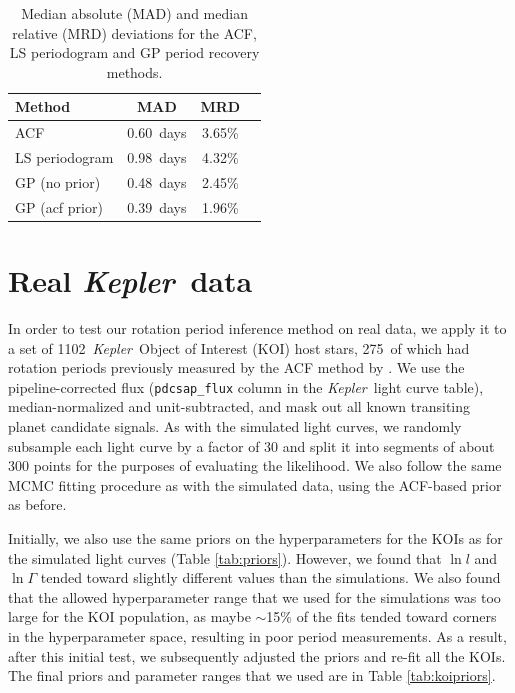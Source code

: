 \documentclass[useAMS, usenatbib, preprint, 12pt]{aastex}
\newcommand{\Kepler}{{\it Kepler}}
\newcommand{\kepler}{\Kepler}
\newcommand{\nkois}{1102}
\newcommand{\nkoimcq}{275}
\newcommand{\acfMAD}{0.60}
\newcommand{\percentacfMAD}{3.65}
\newcommand{\pgramMAD}{0.98}
\newcommand{\percentpgramMAD}{4.32}
\newcommand{\gpMADnp}{0.48}
\newcommand{\percentgpMADnp}{2.45}
\newcommand{\gpMAD}{0.39}
\newcommand{\percentgpMAD}{1.96}
\begin{document}
\begin{table}
\begin{center}
    \caption{Median absolute (MAD) and median relative (MRD) deviations for
    the ACF, LS periodogram and GP period recovery methods.}
\begin{tabular}{lccc}
Method & MAD & MRD \\
    \hline
    ACF & \acfMAD\ days & \percentacfMAD \% \\
    LS periodogram & \pgramMAD\ days & \percentpgramMAD \% \\
    GP (no prior) & \gpMADnp\ days & \percentgpMADnp \% \\
    GP (acf prior) & \gpMAD\ days & \percentgpMAD \% \\
\end{tabular}
\end{center}
\end{table}
\label{tab:MADs}

\section{Real \kepler\ data}
\label{sec:kepler}

In order to test our rotation period inference method on real data,
we apply it to a set of \nkois\ \Kepler\ Object of Interest (KOI)
host stars, \nkoimcq\ of which had rotation periods previously measured by
the ACF method by \citet{Mcquillan2013}.  We use the pipeline-corrected flux
(\texttt{pdcsap\_flux} column in the \Kepler\ light curve table), median-normalized
and unit-subtracted, and mask out all known transiting planet candidate signals.
As with the simulated light curves, we randomly subsample each
light curve by a factor of 30 and split it into segments of about 300 points
for the purposes of evaluating the likelihood.  We also follow the same MCMC
fitting procedure as with the simulated data, using the ACF-based prior as before.

Initially, we also use the same priors on the hyperparameters for the KOIs
as for the simulated light curves (Table \ref{tab:priors}).
However, we found that $\ln l$ and $\ln \Gamma$ tended toward slightly different
values than the simulations.  We also found that the allowed hyperparameter
range that we used for the simulations was too large for the KOI population,
as maybe $\sim$15\% of the fits tended toward corners in the hyperparameter
space, resulting in poor period measurements.  As a result, after this initial
test, we subsequently adjusted the priors and re-fit all the KOIs.
The final priors and parameter ranges that we used are in Table \ref{tab:koipriors}.
\end{document}
